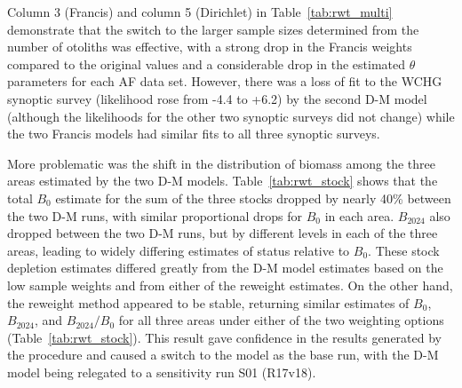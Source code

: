 \documentclass[11pt]{book}
\newcommand{\pc}{\%}
\begin{document}
Column 3 (Francis) and column 5 (Dirichlet) in Table~\ref{tab:rwt_multi} demonstrate that the switch to the larger sample sizes determined from the number of otoliths was effective, with a strong drop in the Francis weights compared to the original values and a considerable drop in the estimated $\theta$ parameters for each AF data set. 
However, there was a loss of fit to the WCHG synoptic survey (likelihood rose from -4.4 to +6.2) by the second D-M model (although the likelihoods for the other two synoptic surveys did not change) while the two Francis models had similar fits to all three synoptic surveys.

More problematic was the shift in the distribution of biomass among the three areas estimated by the two D-M models. 
Table~\ref{tab:rwt_stock} shows that the total $B_0$ estimate for the sum of the three stocks dropped by nearly 40\pc{} between the two D-M runs, with similar proportional drops for $B_0$ in each area.
$B_{2024}$ also dropped between the two D-M runs, but by different levels in each of the three areas, leading to widely differing estimates of status relative to $B_0$.
These stock depletion estimates differed greatly from the D-M model estimates based on the low sample weights and from either of the \citet{Francis:2011} reweight estimates. 
On the other hand, the \citet{Francis:2011} reweight method appeared to be stable, returning similar estimates of $B_0$, $B_{2024}$, and $B_{2024}/B_0$ for all three areas under either of the two weighting options (Table~\ref{tab:rwt_stock}). 
This result gave confidence in the results generated by the \citet{Francis:2011} procedure and caused a switch to the \citet{Francis:2011} model as the base run, with the D-M model being relegated to a sensitivity run S01 (R17v18).
\end{document}
